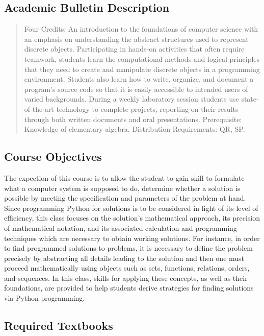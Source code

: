 \documentclass[11pt]{article} %
\begin{document}
\subsection*{Academic Bulletin Description}

\begin{quote}
Four Credits: An introduction to the foundations of computer science with an emphasis on understanding the abstract structures used to represent discrete objects. Participating in hands-on activities that often require teamwork, students learn the computational methods and logical principles that they need to create and manipulate discrete objects in a programming environment. Students also learn how to write, organize, and document a program’s source code so that it is easily accessible to intended users of varied backgrounds. During a weekly laboratory session students use state-of-the-art technology to complete projects, reporting on their results through both written documents and oral presentations.
Prerequisite: Knowledge of elementary algebra. Distribution Requirements: QR, SP.

\end{quote}

\subsection*{Course Objectives}
The expection of this course is to allow the student to gain skill to formulate what a computer system is supposed to do, determine whether a solution is possible by meeting the specification and parameters of the problem at hand. Since programming Python for solutions is to be considered in light of its level of efficiency, this class focuses on the solution's mathematical approach, its precision of mathematical notation, and its associated calculation and programming techniques which are necessary to obtain working solutions. For instance, in order to find programmed solutions to problems, it is necessary to define the problem precisely by abstracting all details leading to the solution and then one must proceed mathematically using objects such as sets, functions, relations, orders, and sequences. In this class, skills for applying these concepts, as well as their foundations, are provided to help students derive strategies for finding solutions via Python programming. 



\subsection*{Required Textbooks}
\end{document}
